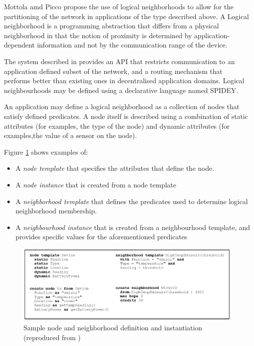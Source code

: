 Mottola amd Picco propose the use of logical neighborhoods to allow for the 
partitioning of the network in applications of the type described above. A 
Logical neighborhood is a programming abstraction that differs from a physical 
neighborhood in that the notion of proximity is determined by 
application-dependent information and not by the communication range of the 
device.

The system described in \cite{mottola_LN:2006} provides an API that restricts 
communication to an application defined subset of the network, and a routing 
mechanism that performs better than existing ones in decentralised application 
domains. Logical neighbourhoods may be defined using a declarative language 
named SPIDEY.

An application may define a logical neighborhood as a collection of nodes that 
satisfy defined predicates. A node itself is described using a combination of 
static attributes (for examples, the type of the node) and dynamic attributes 
(for examples,the value of a sensor on the node).

Figure \ref{Fig:LN_templates_instances} shows examples of:
\begin{itemize} 
 \item A \emph{node template} that specifies the attributes that define the 
 node.
 \item A \emph{node instance} that is created from a node template
 \item A \emph{neighborhood template} that defines the predicates used to 
 determine logical neighborhood membership.
 \item A \emph{neighbourhood instance} that is created from a neighbourhood 
 template, and provides specific values for the aforementioned predicates
\end{itemize}  

\begin{figure}
\centering
\label{Fig:LN_templates_instances}
\includegraphics[scale=0.65]{img/LN_templates_instances.eps} \caption[Sample 
node and neighborhood definition and instantiation]{Sample node and 
neighborhood definition and instantiation (reproduced from \cite{mottola_LN:2006})}
\end{figure}


